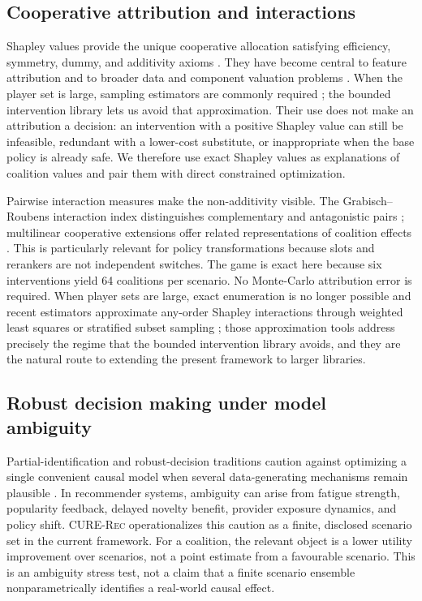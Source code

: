 \documentclass[pdflatex,sn-mathphys-num]{sn-jnl}
\theoremstyle{thmstyleone}
\theoremstyle{thmstyletwo}
\theoremstyle{thmstylethree}
\newcommand{\CURE}{\textsc{CURE-Rec}}
\begin{document}
\subsection{Cooperative attribution and interactions}

Shapley values provide the unique cooperative allocation satisfying efficiency, symmetry, dummy, and additivity axioms \cite{shapley1953}. They have become central to feature attribution \cite{lundberg2017shap,sundararajan2017axiomatic,covert2021understanding} and to broader data and component valuation problems \cite{mcelfresh2023shapley}. When the player set is large, sampling estimators are commonly required \cite{castro2009polynomial}; the bounded intervention library lets us avoid that approximation. Their use does not make an attribution a decision: an intervention with a positive Shapley value can still be infeasible, redundant with a lower-cost substitute, or inappropriate when the base policy is already safe. We therefore use exact Shapley values as explanations of coalition values and pair them with direct constrained optimization.

Pairwise interaction measures make the non-additivity visible. The Grabisch--Roubens interaction index distinguishes complementary and antagonistic pairs \cite{grabisch1999interaction}; multilinear cooperative extensions offer related representations of coalition effects \cite{owen1972multilinear}. This is particularly relevant for policy transformations because slots and rerankers are not independent switches. The game is exact here because six interventions yield 64 coalitions per scenario. No Monte-Carlo attribution error is required. When player sets are large, exact enumeration is no longer possible and recent estimators approximate any-order Shapley interactions through weighted least squares or stratified subset sampling \cite{fumagalli2024kernelshapiq,kolpaczki2024svarmiq}; those approximation tools address precisely the regime that the bounded intervention library avoids, and they are the natural route to extending the present framework to larger libraries.

\subsection{Robust decision making under model ambiguity}

Partial-identification and robust-decision traditions caution against optimizing a single convenient causal model when several data-generating mechanisms remain plausible \cite{manski2003partial,rosenbaum2002observational,athey2017state}. In recommender systems, ambiguity can arise from fatigue strength, popularity feedback, delayed novelty benefit, provider exposure dynamics, and policy shift. \CURE{} operationalizes this caution as a finite, disclosed scenario set in the current framework. For a coalition, the relevant object is a lower utility improvement over scenarios, not a point estimate from a favourable scenario. This is an ambiguity stress test, not a claim that a finite scenario ensemble nonparametrically identifies a real-world causal effect.
\end{document}
